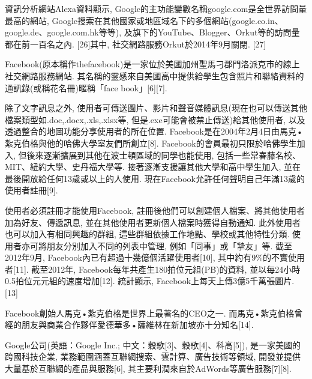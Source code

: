 資訊分析網站Alexa資料顯示, Google的主功能變數名稱google.com是全世界訪問量最高的網站, Google搜索在其他國家或地區域名下的多個網站(google.co.in、google.de、google.com.hk等等), 及旗下的YouTube、Blogger、Orkut等的訪問量都在前一百名之內. [26]其中, 社交網路服務Orkut於2014年9月關閉. [27]

Facebook(原本稱作thefacebook)是一家位於美國加州聖馬刁郡門洛派克市的線上社交網路服務網站. 其名稱的靈感來自美國高中提供給學生包含照片和聯絡資料的通訊錄(或稱花名冊)暱稱「face book」[6][7]. 

除了文字訊息之外, 使用者可傳送圖片、影片和聲音媒體訊息(現在也可以傳送其他檔案類型如.doc,.docx,.xls,.xlsx等, 但是.exe可能會被禁止傳送)給其他使用者, 以及透過整合的地圖功能分享使用者的所在位置. Facebook是在2004年2月4日由馬克•紮克伯格與他的哈佛大學室友們所創立[8]. Facebook的會員最初只限於哈佛學生加入, 但後來逐漸擴展到其他在波士頓區域的同學也能使用, 包括一些常春藤名校、MIT、紐約大學、史丹福大學等. 接著逐漸支援讓其他大學和高中學生加入, 並在最後開放給任何13歲或以上的人使用.  現在Facebook允許任何聲明自己年滿13歲的使用者註冊[9]. 

使用者必須註冊才能使用Facebook, 註冊後他們可以創建個人檔案、將其他使用者加為好友、傳遞訊息, 並在其他使用者更新個人檔案時獲得自動通知. 此外使用者也可以加入有相同興趣的群組, 這些群組依據工作地點、學校或其他特性分類. 使用者亦可將朋友分別加入不同的列表中管理, 例如「同事」或「摯友」等. 截至2012年9月, Facebook內已有超過十幾億個活躍使用者[10], 其中約有9\%的不實使用者[11]. 截至2012年, Facebook每年共產生180拍位元組(PB)的資料, 並以每24小時0.5拍位元元組的速度增加[12]. 統計顯示, Facebook上每天上傳3億5千萬張圖片. [13]

Facebook創始人馬克•紮克伯格是世界上最著名的CEO之一. 而馬克•紮克伯格曾經的朋友與商業合作夥伴愛德華多•薩維林在新加坡亦十分知名[14]. 

Google公司(英語：Google Inc.; 中文：穀歌[3]、穀歌[4]、科高[5]), 是一家美國的跨國科技企業, 業務範圍涵蓋互聯網搜索、雲計算、廣告技術等領域, 開發並提供大量基於互聯網的產品與服務[6], 其主要利潤來自於AdWords等廣告服務[7][8].

